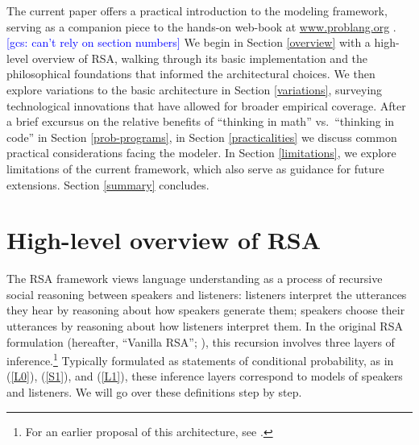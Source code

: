 \documentclass[10pt,letterpaper]{article}
\newcommand{\gcs}[1]{\textcolor{blue}{[gcs: #1]}}
\begin{document}
The current paper offers a practical introduction to the modeling framework, serving as a companion piece to the hands-on web-book at \href{https://www.problang.org}{www.problang.org} \cite{problang}. \gcs{can't rely on section numbers} We begin in Section \ref{overview} with a high-level overview of RSA, walking through its basic implementation and the philosophical foundations that informed the architectural choices. We then explore variations to the basic architecture in Section \ref{variations}, surveying technological innovations that have allowed for broader empirical coverage. After a brief excursus on the relative benefits of ``thinking in math'' vs.~``thinking in code'' in Section \ref{prob-programs}, in Section \ref{practicalities} we discuss common practical considerations facing the modeler. In Section \ref{limitations}, we explore limitations of the current framework, which also serve as guidance for future extensions. Section \ref{summary} concludes.


\section*{High-level overview of RSA} \label{overview}

The RSA framework views language understanding as a process of recursive social reasoning between speakers and listeners: listeners interpret the utterances they hear by reasoning about how speakers generate them; speakers choose their utterances by reasoning about how listeners interpret them. In the original RSA formulation  (hereafter, ``Vanilla RSA''; \cite{frankgoodman2012}), this recursion involves three layers of inference.\footnote{For an earlier proposal of this architecture, see \cite{BenzvanRooijOptimalAssertions2007}.} Typically formulated as statements of conditional probability, as in (\ref{L0}), (\ref{S1}), and (\ref{L1}), these inference layers correspond to models of speakers and listeners. We will go over these definitions step by step.
\end{document}
